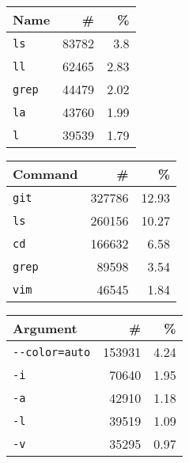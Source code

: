 \begin{adjustbox}{width=\columnwidth,center}
\begin{tabular}{lrr}
\toprule
   Name &           \# &          \% \\
\midrule
    \verb|ls| &  \num{83782} &   \num{3.8} \\
    \verb|ll| &  \num{62465} &  \num{2.83} \\
  \verb|grep| &  \num{44479} &  \num{2.02} \\
    \verb|la| &  \num{43760} &  \num{1.99} \\
     \verb|l| &  \num{39539} &  \num{1.79} \\
\bottomrule
\end{tabular}
\hspace{0.2cm}
\begin{tabular}{lrr}
    \toprule
           Command &            \# &           \% \\
    \midrule
        \verb|git| &  \num{327786} &  \num{12.93} \\
         \verb|ls| &  \num{260156} &  \num{10.27} \\
         \verb|cd| &  \num{166632} &   \num{6.58} \\
       \verb|grep| &   \num{89598} &   \num{3.54} \\
        \verb|vim| &   \num{46545} &   \num{1.84} \\
    \bottomrule
\end{tabular}
\hspace{0.2cm}
\begin{tabular}{lrr}
    \toprule
                Argument &            \# &          \% \\
    \midrule
     \verb|--color=auto| &  \num{153931} &  \num{4.24} \\
               \verb|-i| &   \num{70640} &  \num{1.95} \\
               \verb|-a| &   \num{42910} &  \num{1.18} \\
               \verb|-l| &   \num{39519} &  \num{1.09} \\
               \verb|-v| &   \num{35295} &  \num{0.97} \\
    \bottomrule
\end{tabular}
\end{adjustbox}